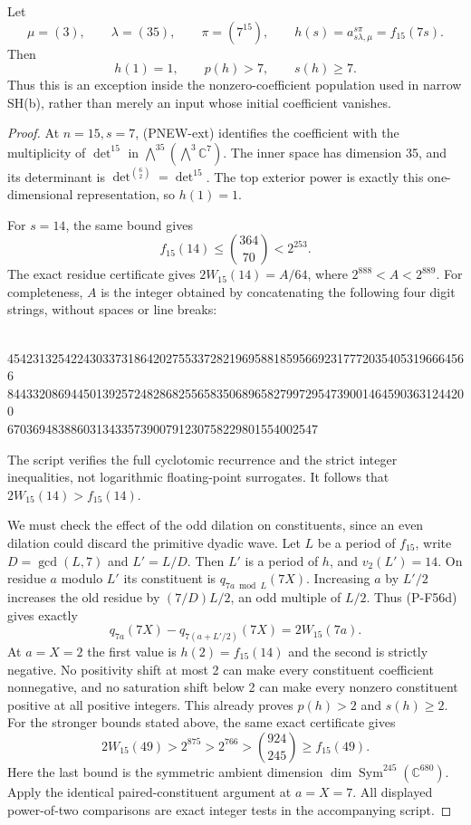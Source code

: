 \begin{proposition}
Let
\[
 \mu=(3),\qquad\lambda=(35),\qquad\pi=(7^{15}),
 \qquad h(s)=a_{s\lambda,\mu}^{s\pi}=f_{15}(7s).
\]
Then
\[
                      h(1)=1,\qquad p(h)>7,\qquad s(h)\ge7.
 \tag{PNEW-positive-start}
\]
Thus this is an exception inside the nonzero-coefficient population
used in narrow SH(b), rather than merely an input whose initial
coefficient vanishes.
\end{proposition}
\begin{proof}
At $n=15,s=7$, (PNEW-ext) identifies the coefficient with the
multiplicity of $\det^{15}$ in
$\bigwedge^{35}(\bigwedge^3\mathbb C^7)$.  The inner space has
dimension 35, and its determinant is $\det^{\binom62}=\det^{15}$.
The top exterior power is exactly this one-dimensional representation,
so $h(1)=1$.

For $s=14$, the same bound gives
\[
             f_{15}(14)\le\binom{364}{70}<2^{253}.
\]
The exact residue certificate gives
$2W_{15}(14)=A/64$, where $2^{888}<A<2^{889}$.
For completeness, $A$ is the integer obtained by concatenating
the following four digit strings, without spaces or line breaks:
\begin{center}\footnotesize{}\\
4542313254224303373186420275533728219695881859566923177720354053196664566\\
8443320869445013925724828682556583506896582799729547390014645903631244200\\
6703694838860313433573900791230758229801554002547
\end{center}
The script verifies the full cyclotomic recurrence and the strict
integer inequalities, not logarithmic floating-point surrogates.
It follows that $2W_{15}(14)>f_{15}(14)$.

We must check the effect of the odd dilation on constituents, since
an even dilation could discard the primitive dyadic wave.  Let $L$
be a period of $f_{15}$, write $D=\gcd(L,7)$ and $L'=L/D$.
Then $L'$ is a period of $h$, and $v_2(L')=14$.
On residue $a$ modulo $L'$ its constituent is
$q_{7a\bmod L}(7X)$.  Increasing $a$ by $L'/2$ increases
the old residue by $(7/D)L/2$, an odd multiple of $L/2$.
Thus (P-F56d) gives exactly
\[
 q_{7a}(7X)-q_{7(a+L'/2)}(7X)=2W_{15}(7a).
\]
At $a=X=2$ the first value is $h(2)=f_{15}(14)$ and
the second is strictly negative.  No positivity shift at most 2
can make every constituent coefficient nonnegative, and no
saturation shift below 2 can make every nonzero constituent
positive at all positive integers.  This already proves
$p(h)>2$ and $s(h)\ge2$.
For the stronger bounds stated above, the same exact certificate gives
\[
       2W_{15}(49)>2^{875}>2^{766}>
               \binom{924}{245}\ge f_{15}(49).
\]
Here the last bound is the symmetric ambient dimension
$\dim\operatorname{Sym}^{245}(\mathbb C^{680})$.
Apply the identical paired-constituent argument at $a=X=7$.
All displayed power-of-two comparisons are exact integer tests
in the accompanying script.
\end{proof}
